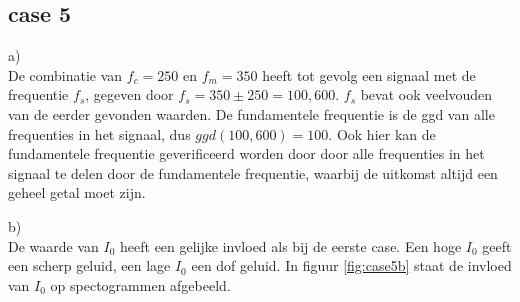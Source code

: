 \documentclass{article}
\begin{document}
\newpage 
\subsection{case 5}
a)\\
De combinatie van $f_c = 250$ en $f_m = 350$ heeft tot gevolg een signaal met de frequentie $f_s$, gegeven door $f_s = 350 \pm 250 = {100, 600}$. $f_s$ bevat ook veelvouden van de eerder gevonden waarden. De fundamentele frequentie is de ggd van alle frequenties in het signaal, dus $ggd(100, 600) = 100$. Ook hier kan de fundamentele frequentie geverificeerd worden door door alle frequenties in het signaal te delen door de fundamentele frequentie, waarbij de uitkomst altijd een geheel getal moet zijn.

b)\\
De waarde van $I_0$ heeft een gelijke invloed als bij de eerste case. Een hoge $I_0$ geeft een scherp geluid, een lage $I_0$ een dof geluid. In figuur \ref{fig:case5b} staat de invloed van $I_0$ op spectogrammen afgebeeld.
\end{document}
